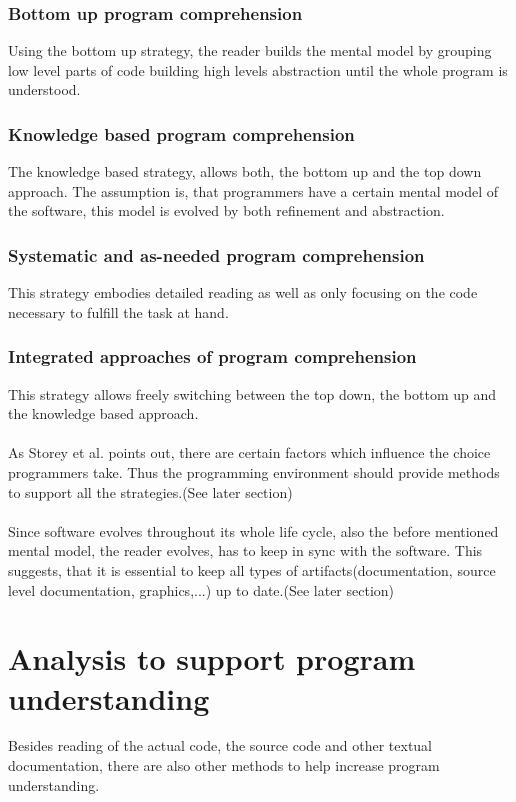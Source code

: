 \subsubsection*{Bottom up program comprehension} Using the bottom up strategy, the reader builds the mental model by grouping low level parts of code building high levels abstraction until the whole program is understood.
\subsubsection*{Knowledge based program comprehension} The knowledge based strategy, allows both, the bottom up and the top down approach. The assumption is, that programmers have a certain mental model of the software, this model is evolved by both refinement and abstraction.
\subsubsection*{Systematic and as-needed program comprehension} This strategy embodies detailed reading as well as only focusing on the code necessary to fulfill the task at hand.
\subsubsection*{Integrated approaches of program comprehension} This strategy allows freely switching between the top down, the bottom up and the knowledge based approach.
\\\\
As Storey et al.\cite{Storey:1999:CDE:308936.308940} points out, there are certain factors which influence the choice programmers take. Thus the programming environment should provide methods to support all the strategies.(See later section)
\\\\
Since software evolves throughout its whole life cycle, also the before mentioned mental model, the reader evolves, has to keep in sync with the software. This suggests, that it is essential to keep all types of artifacts(documentation, source level documentation, graphics,...) up to date.(See later section)

\section{Analysis to support program understanding}

Besides reading of the actual code, the source code and other textual documentation, there are also other methods to help increase program understanding.

